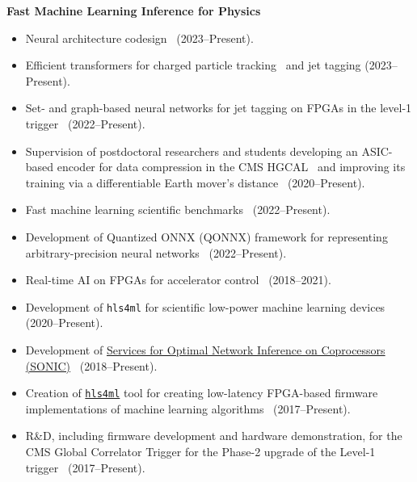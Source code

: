\documentclass[11pt]{res}
\begin{document}
\begin{resume}
  \textbf{Fast Machine Learning Inference for Physics}
  \begin{itemize}
    \itemsep-0.3em
    \item Neural architecture codesign~\cite{McDermott:2023neural} (2023--Present).
    \item Efficient transformers for charged particle tracking~\cite{Miao:2024oqy} and jet tagging (2023--Present).
    \item Set- and graph-based neural networks for jet tagging on FPGAs in the level-1 trigger~\cite{Odagiu:2024bkp} (2022--Present).
    \item Supervision of postdoctoral researchers and students developing an ASIC-based encoder for data compression in the CMS HGCAL~\cite{DiGuglielmo:2021ide} and improving its training via a differentiable Earth mover's distance~\cite{Shenoy:2023ros} ({2020--Present}).
    \item Fast machine learning scientific benchmarks~\cite{Duarte:2022hdp} (2022--Present).
    \item Development of Quantized ONNX (QONNX) framework for representing arbitrary-precision neural networks~\cite{Pappalardo:2022nxk} (2022--Present).
    \item Real-time AI on FPGAs for accelerator control~\cite{John:2020sak} ({2018--2021}).
    \item Development of \texttt{hls4ml} for scientific low-power machine learning devices~\cite{Campos:2023pkp,Weng:2023tailor,Hussain:2022faststamp,Borras:2022opensource,Banbury:2021mlperf,DiGuglielmo:2021ide,Hawks:2021ruw,Fahim:2021cic} ({2020--Present}).
    \item Development of \href{https://github.com/fastmachinelearning/SonicCMS}{Services for Optimal Network Inference on Coprocessors (SONIC)}~\cite{CMS:2024twn,CMS-DP-2023-037,Krupa:2020bwg,Rankin:2020usv,neurips2019_sonic,Duarte:2019fta} ({2018--Present}).
    \item Creation of \href{https://fastmachinelearning.org/hls4ml/}{\texttt{hls4ml}} tool for creating low-latency FPGA-based firmware implementations of machine learning algorithms~\cite{Deiana:2021niw,Elabd:2021lgo,Govorkova:2021utb,Iiyama:2020wap,Heintz:2020soy,DiGuglielmo:2020eqx,Summers:2020xiy,neurips2019_hls4ml,Duarte:2018ite} ({2017--Present}).
    \item R\&D, including firmware development and hardware demonstration, for the CMS Global Correlator Trigger for the Phase-2 upgrade of the Level-1 trigger~\cite{CERN-LHCC-2020-004} (2017--Present).
  \end{itemize}


\end{resume}
\end{document}
